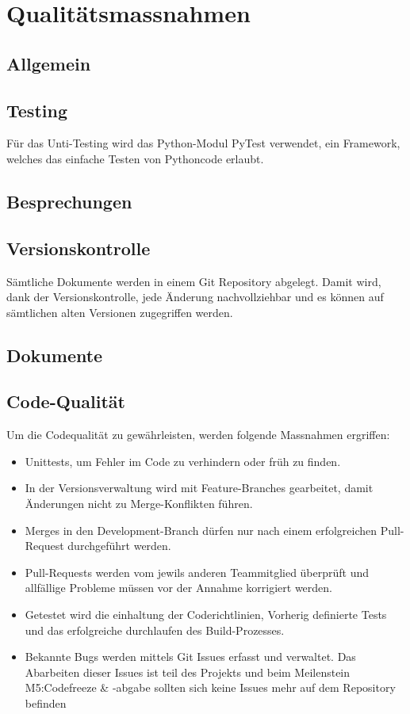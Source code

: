 \documentclass[
	ngerman,
	toc=listof, %
	toc=bibliography, %
	footnotes=multiple, %
	parskip=half, %
	numbers=noendperiod %
]{scrartcl}
\begin{document}
		

\section{Qualitätsmassnahmen}
	\subsection{Allgemein}

	\subsection{Testing}
		Für das Unti-Testing wird das Python-Modul PyTest verwendet, ein Framework, welches das einfache Testen von Pythoncode erlaubt.

	\subsection{Besprechungen}

	\subsection{Versionskontrolle}
		Sämtliche Dokumente werden in einem Git Repository abgelegt. Damit wird, dank der Versionskontrolle, 
		jede Änderung nachvollziehbar und es können auf sämtlichen alten Versionen zugegriffen werden.

	\subsection{Dokumente}

	\subsection{Code-Qualität}
		Um die Codequalität zu gewährleisten, werden folgende Massnahmen ergriffen:
		\begin{itemize}
			\item Unittests, um Fehler im Code zu verhindern oder früh zu finden.
			\item In der Versionsverwaltung wird mit Feature-Branches gearbeitet, damit Änderungen nicht zu Merge-Konflikten führen.
			\item Merges in den Development-Branch dürfen nur nach einem erfolgreichen Pull-Request durchgeführt werden.
			\item Pull-Requests werden vom jewils anderen Teammitglied überprüft und allfällige Probleme müssen vor der Annahme korrigiert werden.
			\item Getestet wird die einhaltung der Coderichtlinien, Vorherig definierte Tests und das erfolgreiche durchlaufen des Build-Prozesses.
			\item Bekannte Bugs werden mittels Git Issues erfasst und verwaltet. Das Abarbeiten dieser Issues ist teil des Projekts und beim Meilenstein M5:Codefreeze \& -abgabe sollten sich keine Issues mehr auf dem Repository befinden
		\end{itemize}
\end{document}
